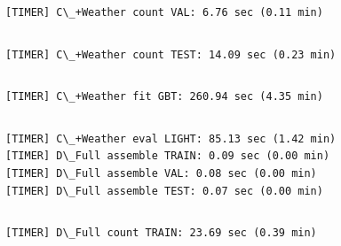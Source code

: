\documentclass[11pt]{article}
\begin{document}
    \begin{Verbatim}[commandchars=\\\{\}]

    \end{Verbatim}

    \begin{Verbatim}[commandchars=\\\{\}]
[TIMER] C\_+Weather count VAL: 6.76 sec (0.11 min)
    \end{Verbatim}

    \begin{Verbatim}[commandchars=\\\{\}]

    \end{Verbatim}

    \begin{Verbatim}[commandchars=\\\{\}]
[TIMER] C\_+Weather count TEST: 14.09 sec (0.23 min)
    \end{Verbatim}

    \begin{Verbatim}[commandchars=\\\{\}]

    \end{Verbatim}

    \begin{Verbatim}[commandchars=\\\{\}]
[TIMER] C\_+Weather fit GBT: 260.94 sec (4.35 min)
    \end{Verbatim}

    \begin{Verbatim}[commandchars=\\\{\}]

    \end{Verbatim}

    \begin{Verbatim}[commandchars=\\\{\}]
[TIMER] C\_+Weather eval LIGHT: 85.13 sec (1.42 min)
[TIMER] D\_Full assemble TRAIN: 0.09 sec (0.00 min)
[TIMER] D\_Full assemble VAL: 0.08 sec (0.00 min)
[TIMER] D\_Full assemble TEST: 0.07 sec (0.00 min)
    \end{Verbatim}

    \begin{Verbatim}[commandchars=\\\{\}]

    \end{Verbatim}

    \begin{Verbatim}[commandchars=\\\{\}]
[TIMER] D\_Full count TRAIN: 23.69 sec (0.39 min)
    \end{Verbatim}
\end{document}
